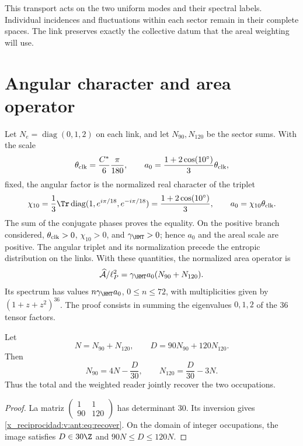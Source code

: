 This transport acts on the two uniform modes and their spectral
labels. Individual incidences and fluctuations within
each sector remain in their complete spaces. The link preserves
exactly the collective datum that the areal weighting will use.

\section{Angular character and area operator}
\label{x_reciprocidad:v:ant:sec:ii-area-caracter}

Let $N_e=\operatorname{diag}(0,1,2)$ on each link, and let
$N_{90},N_{120}$ be the sector sums. With the scale
\[
\theta_{\rm clk}=\frac{C^*}{6}\frac{\pi}{180},\qquad
a_0=\frac{1+2\cos(10^\circ)}3\theta_{\rm clk},
\]
fixed, the angular factor is the normalized real character of the triplet
\begin{equation}
 \chi_{10}=\frac13\Tr\operatorname{diag}
       (1,e^{i\pi/18},e^{-i\pi/18})
 =\frac{1+2\cos(10^\circ)}3,
 \qquad a_0=\chi_{10}\theta_{\rm clk}.
 \label{x_reciprocidad:v:ant:eq:ii-area-caracter-triplete}
\end{equation}
The sum of the conjugate phases proves the equality. On the positive branch
considered, \(\theta_{\rm clk}>0\), \(\chi_{10}>0\), and
\(\gamma_{\HMT}>0\); hence \(a_0\) and the areal scale are
positive. The angular triplet and its normalization precede the
entropic distribution on the links. With these quantities,
the normalized area operator is
\[
\widehat{\mathcal A}/\ell_P^2
=\gamma_{\HMT}a_0(N_{90}+N_{120}).
\]
Its spectrum has values $n\gamma_{\HMT}a_0$, $0\le n\le72$,
with multiplicities given by $(1+z+z^2)^{36}$.
The proof consists in summing the eigenvalues $0,1,2$ of the
36 tensor factors.

\begin{theorem}
Let
\[
N=N_{90}+N_{120},\qquad D=90N_{90}+120N_{120}.
\]
Then
\begin{equation}
N_{90}=4N-\frac D{30},\qquad
N_{120}=\frac D{30}-3N.
\label{x_reciprocidad:v:ant:eq:recover}
\end{equation}
Thus the total and the weighted reader jointly recover
the two occupations.
\end{theorem}
\begin{proof}
La matriz $\left(\begin{smallmatrix}1&1\\90&120\end{smallmatrix}\right)$
has determinant $30$. Its inversion gives \eqref{x_reciprocidad:v:ant:eq:recover}.
On the domain of integer occupations, the image satisfies
$D\in30\Z$ and $90N\le D\le120N$.
\end{proof}

